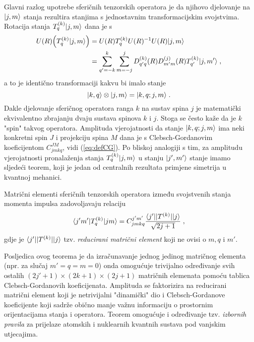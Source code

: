 Glavni razlog upotrebe sferičnih tenzorskih operatora je da njihovo
djelovanje na $| j,m \rangle$ stanja rezultira stanjima s jednostavnim
transformacijskim svojstvima. Rotacija stanja
$T^{(k)}_q| j,m \rangle$ dana je s
\begin{align}
    U(R) \Big( T^{(k)}_q| j,m \rangle \Big)& =
        U(R)  T^{(k)}_q U(R)^{-1} U(R) | j,m \rangle  \\
   &= \sum_{q'=-k}^{k} \sum_{m=-j}^{j}
   D^{(k)}_{q'q}(R) D^{(j)}_{m'm}(R) T^{(k)}_{q'} | j, m' \rangle \;,
\end{align}
a to je identično transformaciji kakvu bi imalo stanje
\begin{equation}
    | k, q \rangle \otimes | j, m \rangle = | k, q; j, m \rangle \;.
\end{equation}
Dakle djelovanje sferičnog operatora ranga $k$ na sustav spina $j$ 
je matematički ekvivalentno zbrajanju dvaju sustava spinova $k$ i $j$.
Stoga se često kaže da je $k$ "spin" takvog operatora.
Amplituda vjerojatnosti da stanje $| k, q; j, m \rangle$ ima
neki konkretni spin $J$ i projekciju spina $M$ dana je s Clebsch-Gordanovim
koeficijentom $C^{J M}_{jmkq}$, vidi (\ref{eq:defCG}).
Po bliskoj analogiji s tim, za amplitudu vjerojatnosti
pronalaženja stanja $T^{(k)}_q| j,m \rangle$ u stanju $| j',m' \rangle$
stanje  imamo sljedeći teorem, koji je jedan od centralnih
rezultata primjene simetrija u kvantnoj mehanici.
\begin{teorem}
Matrični elementi sferičnih tenzorskih operatora između svojstvenih stanja momenta
impulsa zadovoljavaju relaciju
\begin{equation}
 \langle j'm' |T^{(k)}_q | jm \rangle = C^{j'm'}_{jmkq}
\frac{\langle j' ||T^{(k)}|| j \rangle}{\sqrt{2j+1}} \;,
\end{equation}
gdje je $\langle j' ||T^{(k)}|| j \rangle$ tzv. \emph{reducirani matrični element}
koji ne ovisi o $m, q$ i $m'$.
\end{teorem}
Posljedica ovog teorema je da izračunavanje jednog jedinog matričnog elementa
(npr. za slučaj $m'=q=m=0$) onda omogućuje trivijalno određivanje svih ostalih
$(2j'+1)\times(2k+1)\times(2j+1)$ matričnih elemenata
pomoću tablica Clebsch-Gordanovih koeficijenata.
Amplituda se faktorizira na reducirani matrični element koji je netrivijalni 
"dinamički" dio i Clebsch-Gordanove koeficijente koji sadrže obično
manje važnu informaciju o prostornim orijentacijama stanja i operatora.
Teorem omogućuje i određivanje tzv. \emph{izbornih pravila} za prijelaze
atomskih i nuklearnih kvantnih sustava pod vanjskim utjecajima.

